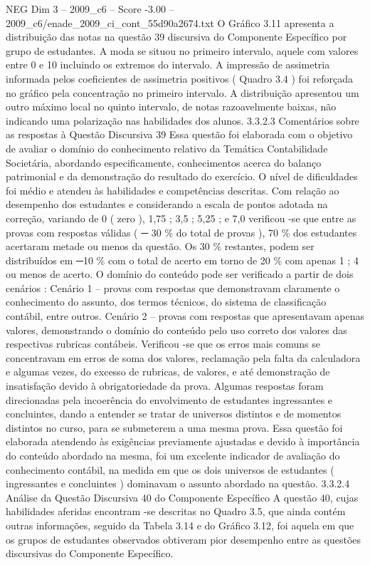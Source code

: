 \begin{textsample}{NEG Dim 3 – 2009\_c6 – Score -3.00 – 2009\_c6/enade\_2009\_ci\_cont\_55d90a2674.txt}
O Gráfico 3.11 apresenta a distribuição das notas na questão 39 discursiva do Componente Específico por grupo de estudantes.
A moda se situou no primeiro intervalo, aquele com valores entre 0 e 10 incluindo os extremos do intervalo.
A impressão de assimetria informada pelos coeficientes de assimetria positivos ( Quadro 3.4 ) foi reforçada no gráfico pela concentração no primeiro intervalo.
A distribuição apresentou um outro máximo local no quinto intervalo, de notas razoavelmente baixas, não indicando uma polarização nas habilidades dos alunos. 3.3.2.3 Comentários sobre as respostas à Questão Discursiva 39 Essa questão foi elaborada com o objetivo de avaliar o domínio do conhecimento relativo da Temática Contabilidade Societária, abordando especificamente, conhecimentos acerca do balanço patrimonial e da demonstração do resultado do exercício.
O nível de dificuldades foi médio e atendeu às habilidades e competências descritas.
Com relação ao desempenho dos estudantes e considerando a escala de pontos adotada na correção, variando de 0 ( zero ), 1,75 ; 3,5 ; 5,25 ; e 7,0 verificou -se que entre as provas com respostas válidas ( {\EmojiFont ─} 30 \% do total de provas ), 70 \% dos estudantes acertaram metade ou menos da questão.
Os 30 \% restantes, podem ser distribuídos em {\EmojiFont ─}10 \% com o total de acerto em torno de 20 \% com apenas 1 ; 4 ou menos de acerto.
O domínio do conteúdo pode ser verificado a partir de dois cenários : Cenário 1 – provas com respostas que demonstravam claramente o conhecimento do assunto, dos termos técnicos, do sistema de classificação contábil, entre outros.
Cenário 2 – provas com respostas que apresentavam apenas valores, demonstrando o domínio do conteúdo pelo uso correto dos valores das respectivas rubricas contábeis.
Verificou -se que os erros mais comuns se concentravam em erros de soma dos valores, reclamação pela falta da calculadora e algumas vezes, do excesso de rubricas, de valores, e até demonstração de insatisfação devido à obrigatoriedade da prova.
Algumas respostas foram direcionadas pela incoerência do envolvimento de estudantes ingressantes e concluintes, dando a entender se tratar de universos distintos e de momentos distintos no curso, para se submeterem a uma mesma prova.
Essa questão foi elaborada atendendo às exigências previamente ajustadas e devido à importância do conteúdo abordado na mesma, foi um excelente indicador de avaliação do conhecimento contábil, na medida em que os dois universos de estudantes ( ingressantes e concluintes ) dominavam o assunto abordado na questão. 3.3.2.4 Análise da Questão Discursiva 40 do Componente Específico A questão 40, cujas habilidades aferidas encontram -se descritas no Quadro 3.5, que ainda contém outras informações, seguido da Tabela 3.14 e do Gráfico 3.12, foi aquela em que os grupos de estudantes observados obtiveram pior desempenho entre as questões discursivas do Componente Específico.

\end{textsample}
